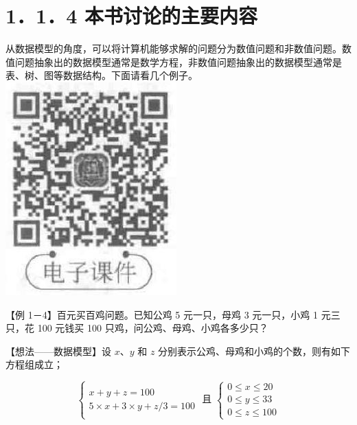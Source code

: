 \documentclass[10pt]{article}
\begin{document}
\section*{1．1．4 本书讨论的主要内容}
从数据模型的角度，可以将计算机能够求解的问题分为数值问题和非数值问题。数值问题抽象出的数据模型通常是数学方程，非数值问题抽象出的数据模型通常是表、树、图等数据结构。下面请看几个例子。\\
\includegraphics[max width=\textwidth, center]{2025_06_06_704745ea57b15b2333e5g-020(2)}

【例 1－4】百元买百鸡问题。已知公鸡 5 元一只，母鸡 3 元一只，小鸡 1 元三只，花 100 元钱买 100 只鸡，问公鸡、母鸡、小鸡各多少只？

【想法——数据模型】设 $x 、 y$ 和 $z$ 分别表示公鸡、母鸡和小鸡的个数，则有如下方程组成立；

$$
\left\{\begin{array} { l } 
{ x + y + z = 1 0 0 } \\
{ 5 \times x + 3 \times y + z / 3 = 1 0 0 }
\end{array} \text { 且 } \left\{\begin{array}{l}
0 \leqslant x \leqslant 20 \\
0 \leqslant y \leqslant 33 \\
0 \leqslant z \leqslant 100
\end{array}\right.\right.
$$
\end{document}
